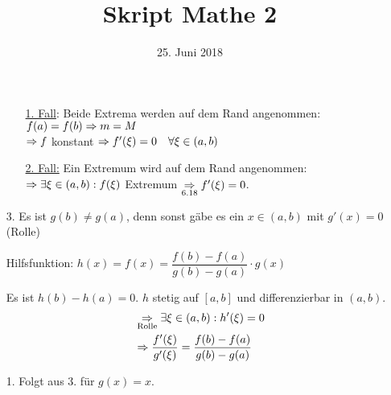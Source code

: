 \documentclass[10pt, a4paper, fleqn]{article}
\begin{document}
    \title{Skript Mathe 2}
    \date{25. Juni 2018}
    \maketitle
\fi

\begin{enumerate}
    \item[]
    \begin{enumerate}
        \addtolength{\itemindent}{12pt}
        \item[\underline{1. Fall}:] Beide Extrema werden auf dem Rand angenommen: \\
        $f(a) = f(b) \Rightarrow m = M$ \\
        $\Rightarrow f$ konstant $\Rightarrow f'(\xi) = 0 \quad \forall \xi \in (a, b)$
        \item[\underline{2. Fall:}] Ein Extremum wird auf dem Rand angenommen: \\
        $\Rightarrow \exists \xi \in (a, b): f(\xi)$ Extremum $\underset{6.18}{\Rightarrow}
        f'(\xi) = 0$.
    \end{enumerate}
    \item[3.]
    Es ist $g(b) \neq g(a)$, denn sonst gäbe es ein $x \in (a, b)$ mit $g'(x) = 0$ (Rolle)

    Hilfsfunktion: $h(x) = f(x) = \dfrac{f(b) - f(a)}{g(b) - g(a)} \cdot g(x)$

    Es ist $h(b) - h(a) = 0$. $h$ stetig auf $[a, b]$ und differenzierbar in $(a, b)$.
    \[\begin{aligned}
        &\underset{\text{Rolle}}{\Rightarrow} \exists \xi \in (a, b): h'(\xi) = 0 \\
        &\Rightarrow \frac{f'(\xi)}{g'(\xi)} = \frac{f(b) - f(a)}{g(b) - g(a)}
    \end{aligned}\]
    \item[1.] Folgt aus 3. für $g(x) = x$.
\end{enumerate}
\end{document}
